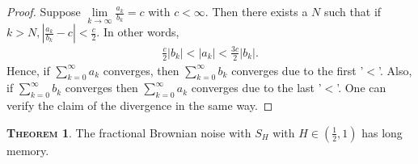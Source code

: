 \documentclass[a4paper, twoside, 11pt]{article}
\theoremstyle{definition}
\newtheorem{theorem}[definition]{\scshape Theorem}
\begin{document}
	\begin{proof}
	  Suppose $\lim\limits_{k\rightarrow \infty}\frac{a_k}{b_k}=c$ with $c<\infty$. Then there exists a $N$ such that if $k > N, |\frac{a_k}{b_k} - c| < \frac{c}{2}$. In other words, 
	  \begin{eqnarray*}
		\frac{c}{2}|b_k| < |a_k| < \frac{3c}{2}|b_k|.
	  \end{eqnarray*}
	  Hence, if $\sum_{k=0}^{\infty} a_k$ converges, then $\sum_{k=0}^{\infty} b_k$ converges due to the first '$<$'. Also, if $\sum_{k=0}^{\infty} b_k$ converges then $\sum_{k=0}^{\infty} a_k$ converges due to the last '$<$'. One can verify the claim of the divergence in the same way.
	\end{proof}
	\begin{theorem}
	  The fractional Brownian noise with $S_H$ with $H \in (\frac{1}{2}, 1)$ has long memory.
	  \label{sec:lmemory}
	\end{theorem}
\end{document}
